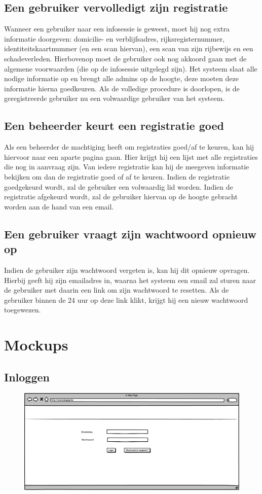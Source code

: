 \documentclass[11pt,a4paper,oneside]{article}
\begin{document}
\subsection{Een gebruiker vervolledigt zijn registratie}
Wanneer een gebruiker naar een infosessie is geweest, moet hij nog extra informatie doorgeven: domicilie- en verblijfsadres, rijksregisternummer, identiteitskaartnummer (en een scan hiervan), een scan van zijn rijbewijs en een schadeverleden. Hierbovenop moet de gebruiker ook nog akkoord gaan met de algemene voorwaarden (die op de infosessie uitgelegd zijn). Het systeem slaat alle nodige informatie op en brengt alle admins op de hoogte, deze moeten deze informatie hierna goedkeuren. Als de volledige procedure is doorlopen, is de geregistreerde gebruiker nu een volwaardige gebruiker van het systeem.

\subsection{Een beheerder keurt een registratie goed}
Als een beheerder de machtiging heeft om registraties goed/af te keuren, kan hij hiervoor naar een aparte pagina gaan. Hier krijgt hij een lijst met alle registraties die nog in aanvraag zijn. Van iedere registratie kan hij de meegeven informatie bekijken om dan de registratie goed of af te keuren. Indien de registratie goedgekeurd wordt, zal de gebruiker een volwaardig lid worden. Indien de registratie afgekeurd wordt, zal de gebruiker hiervan op de hoogte gebracht worden aan de hand van een email.

\subsection{Een gebruiker vraagt zijn wachtwoord opnieuw op}
Indien de gebruiker zijn wachtwoord vergeten is, kan hij dit opnieuw opvragen. Hierbij geeft hij zijn emailadres in, waarna het systeem een email zal sturen naar de gebruiker met daarin een link om zijn wachtwoord te resetten. Als de gebruiker binnen de 24 uur op deze link klikt, krijgt hij een nieuw wachtwoord toegewezen.

\section{Mockups}
\subsection{Inloggen}
\begin{figure}[H]\includegraphics[width=\textwidth]{../../mockups/login.png}\end{figure}
\end{document}
